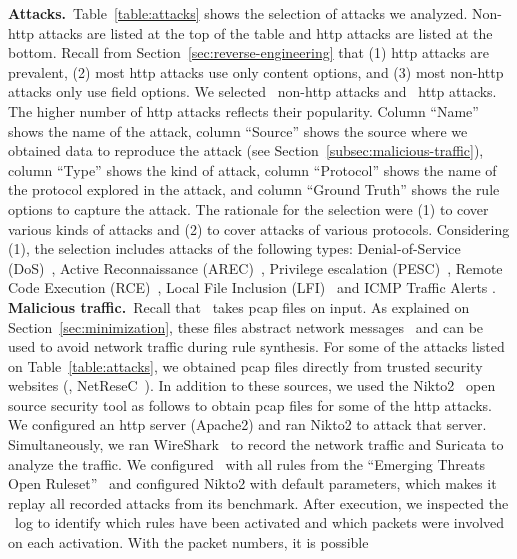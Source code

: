 \documentclass[conference]{IEEEtran}
\begin{document}
\noindent\textbf{Attacks.}~Table~\ref{table:attacks} shows the selection
of attacks we analyzed.  Non-http attacks are listed at the top of the
table and http attacks are listed at the bottom. Recall from
Section~\ref{sec:reverse-engineering} that (1) http attacks are
prevalent, (2) most http attacks use only content options, and (3)
most non-http attacks only use field options. We selected
\numNonContentAttacks\ non-http attacks and \numContentAttacks\ http
attacks. The higher number of http attacks reflects their
popularity. Column ``Name'' shows the name of the attack, column
``Source'' shows the source where we obtained data to reproduce the
attack (see Section~\ref{subsec:malicious-traffic}), column ``Type''
shows the kind of attack, column ``Protocol'' shows the name of the
protocol explored in the attack, and column ``Ground Truth'' shows the
rule options to capture the attack. The rationale for the selection
were (1) to cover various kinds of attacks and (2) to cover attacks of
various protocols. Considering (1), the selection includes attacks of
the following types: Denial-of-Service (DoS)~\cite{denial-of-service},
Active Reconnaissance (AREC)~\cite{active-reconnaissance}, Privilege
escalation (PESC)~\cite{privilege-escalation}, Remote Code Execution
(RCE)~\cite{remote-code-execution}, Local File Inclusion
(LFI)~\cite{local-file-inclusion} and ICMP Traffic Alerts \cite{icmp-types}.
\noindent\textbf{Malicious traffic.}~Recall that \tname\ takes
pcap files on input. As explained on Section~\ref{sec:minimization},
these files abstract network messages~\cite{pcap} and can be used to
avoid network traffic during rule synthesis. For some of the attacks
listed on Table~\ref{table:attacks}, we obtained pcap files directly
from trusted security websites (\eg{},
NetReseC~\cite{pcap-attacks}). In addition to these sources, we used
the Nikto2~\cite{nikto} open source security tool as follows to obtain
pcap files for some of the http attacks. We configured an http server
(Apache2) and ran Nikto2 to attack that server. Simultaneously, we ran
WireShark~\cite{wireshark-net-monitor} to record the network traffic
and Suricata to analyze the traffic. We configured \suri\ with all
rules from the ``Emerging Threats Open
Ruleset''~\cite{emerging-threats-open} and configured Nikto2 with
default parameters, which makes it replay all recorded attacks from
its benchmark. After execution, we inspected the \suri\ log to
identify which rules have been activated and which packets were
involved on each activation. With the packet numbers, it is possible
\end{document}
